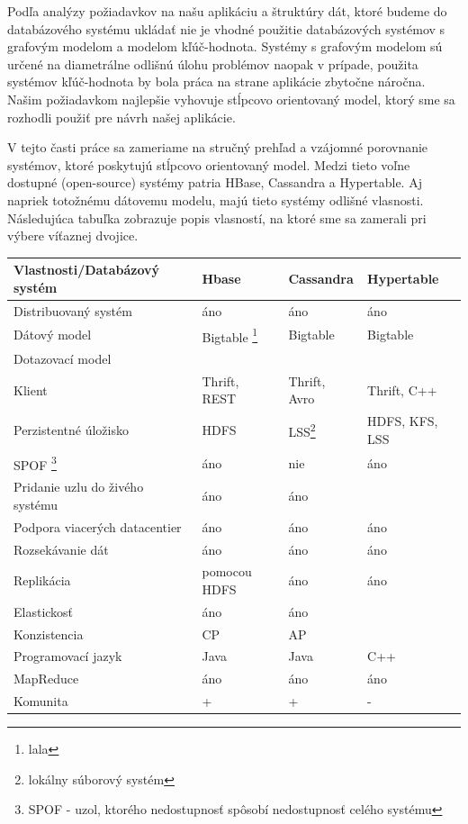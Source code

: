 \documentclass[11pt,twoside,a4paper]{book}
\begin{document}
Podľa analýzy požiadavkov na našu aplikáciu a štruktúry dát, ktoré budeme do databázového systému ukládať nie je vhodné použitie databázových systémov s grafovým modelom a modelom kľúč-hodnota. Systémy s grafovým modelom sú určené na diametrálne odlišnú úlohu problémov naopak v prípade, použita systémov kľúč-hodnota by bola práca na strane aplikácie zbytočne náročna. Našim požiadavkom najlepšie vyhovuje stĺpcovo orientovaný model, ktorý sme sa rozhodli použiť pre návrh našej aplikácie.

V tejto časti práce sa zameriame na stručný prehľad a vzájomné porovnanie systémov, ktoré poskytujú stĺpcovo orientovaný model. Medzi tieto voľne dostupné (open-source) systémy patria HBase, Cassandra a Hypertable. Aj napriek totožnému dátovemu modelu, majú tieto systémy odlišné vlasnosti. Následujúca tabuľka zobrazuje popis vlasností, na ktoré sme sa zamerali pri výbere víťaznej dvojice.

\begin{table}
    \begin{tabular}{|l|l|l|l|}
        \hline
        Vlastnosti/Databázový systém & Hbase & Cassandra & Hypertable \\  \hline
        Distribuovaný systém	& áno  & áno & áno \\ \hline 
        Dátový model		& Bigtable \footnote{lala} & Bigtable & Bigtable \\ \hline
        Dotazovací model	& ~  & ~ &  \\ \hline
	Klient 			& Thrift, REST  & Thrift, Avro & Thrift, C++ \\ \hline
        Perzistentné úložisko	& HDFS  & LSS\footnote{lokálny súborový systém} & HDFS, KFS, LSS \\ \hline
        SPOF \footnote{SPOF - uzol, ktorého nedostupnosť spôsobí nedostupnosť celého systému}	& áno  & nie & áno \\ \hline
	Pridanie uzlu do živého systému & áno  & áno & ~ \\ \hline
	Podpora viacerých datacentier & áno  & áno & áno \\ \hline
	Rozsekávanie dát 	& áno  & áno & áno \\ \hline
        Replikácia 		& pomocou HDFS  & áno & áno \\ \hline
	Elastickosť	        & áno  & áno & ~ \\ \hline
	Konzistencia 		& CP  & AP & ~ \\ \hline
	Programovací jazyk 	& Java  & Java & C++ \\ \hline
	MapReduce 		& áno  & áno & áno \\ \hline
	Komunita 		& +  & +  & - \\ \hline
    \end{tabular}
\end{table}
\end{document}
